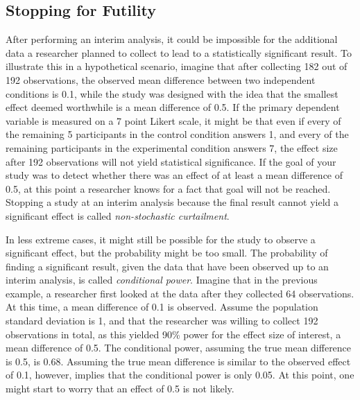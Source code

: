 \documentclass[
  english,
  ,jou, a4paper,floatsintext]{apa6}
\begin{document}
\hypertarget{stopping-for-futility}{%
\subsection{Stopping for Futility}\label{stopping-for-futility}}

After performing an interim analysis, it could be impossible for the additional data a researcher planned to collect to lead to a statistically significant result. To illustrate this in a hypothetical scenario, imagine that after collecting 182 out of 192 observations, the observed mean difference between two independent conditions is 0.1, while the study was designed with the idea that the smallest effect deemed worthwhile is a mean difference of 0.5. If the primary dependent variable is measured on a 7 point Likert scale, it might be that even if every of the remaining 5 participants in the control condition answers 1, and every of the remaining participants in the experimental condition answers 7, the effect size after 192 observations will not yield statistical significance. If the goal of your study was to detect whether there was an effect of at least a mean difference of 0.5, at this point a researcher knows for a fact that goal will not be reached. Stopping a study at an interim analysis because the final result cannot yield a significant effect is called \emph{non-stochastic curtailment}.

In less extreme cases, it might still be possible for the study to observe a significant effect, but the probability might be too small. The probability of finding a significant result, given the data that have been observed up to an interim analysis, is called \emph{conditional power}. Imagine that in the previous example, a researcher first looked at the data after they collected 64 observations. At this time, a mean difference of 0.1 is observed. Assume the population standard deviation is 1, and that the researcher was willing to collect 192 observations in total, as this yielded 90\% power for the effect size of interest, a mean difference of 0.5. The conditional power, assuming the true mean difference is 0.5, is 0.68. Assuming the true mean difference is similar to the observed effect of 0.1, however, implies that the conditional power is only 0.05. At this point, one might start to worry that an effect of 0.5 is not likely.
\end{document}
